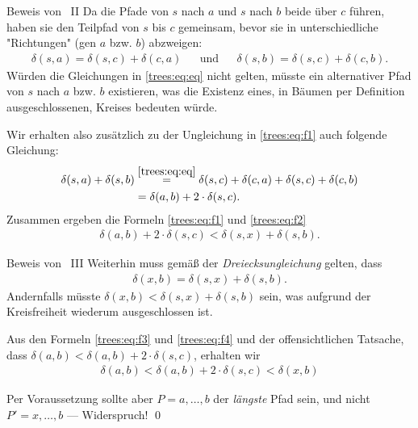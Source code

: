 \begin{frame}{Beweis von  \, II}
Da die Pfade von $s$ nach $a$ und $s$ nach $b$ beide \"uber $c$ f\"uhren, haben sie den Teilpfad von $s$ bis $c$ gemeinsam, bevor sie in unterschiedliche "Richtungen" (gen $a$ bzw. $b$) abzweigen:
\begin{align}\label{trees:eq:eq}
    \delta(s, a) = \delta(s, c) + \delta(c, a) && \text{und} && \delta(s, b) = \delta(s, c) + \delta(c, b).
\end{align}
W\"urden die Gleichungen in \eqref{trees:eq:eq} nicht gelten, m\"usste ein alternativer Pfad von $s$ nach $a$ bzw. $b$ existieren, was die Existenz eines, in B\"aumen per Definition ausgeschlossenen, Kreises bedeuten w\"urde.

Wir erhalten also zus\"atzlich zu der Ungleichung in \eqref{trees:eq:f1} auch folgende Gleichung:
\begin{align}
\begin{split}\label{trees:eq:f2}
    \delta(s, a) + \delta(s, b) &\overset{\eqref{trees:eq:eq}}{=} \delta(s, c) + \delta(c, a) + \delta(s, c) + \delta(c, b)\\
    &= \delta(a, b) + 2 \cdot \delta(s, c).
\end{split}
\end{align}
Zusammen ergeben die Formeln \eqref{trees:eq:f1} und \eqref{trees:eq:f2}
\begin{align}\label{trees:eq:f3}
    \delta(a, b) + 2 \cdot \delta(s, c) < \delta(s, x) + \delta(s, b).
\end{align}
\end{frame}

\begin{frame}{Beweis von  \, III}
Weiterhin muss gem\"a{\ss} der \emph{Dreiecksungleichung} gelten, dass
\begin{align}\label{trees:eq:f4}
    \delta(x, b) = \delta(s, x) + \delta(s, b).
\end{align}
Andernfalls m\"usste $\delta(x, b) < \delta(s, x) + \delta(s, b)$ sein, was aufgrund der Kreisfreiheit wiederum ausgeschlossen ist.

Aus den Formeln \eqref{trees:eq:f3} und \eqref{trees:eq:f4} und der offensichtlichen Tatsache, dass $\delta(a, b) < \delta(a, b) + 2 \cdot \delta(s, c)$, erhalten wir
\begin{align}
    \delta(a, b) < \delta(a, b) + 2 \cdot \delta(s, c) < \delta(x, b)
\end{align}

Per Voraussetzung sollte aber $P = a, \dots, b$ der \emph{l\"angste} Pfad sein, und nicht $P' = x, \dots, b$ --- Widerspruch! \qed
\end{frame}

